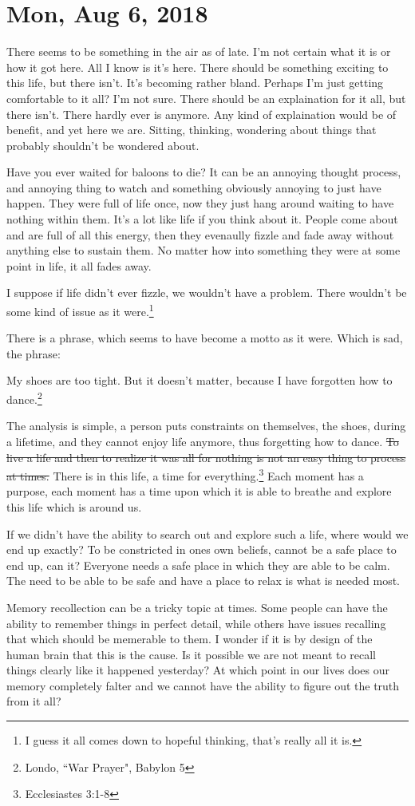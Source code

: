 \section{Mon, Aug 6, 2018}

There seems to be something in the air as of late. I'm not certain what it is or how
it got here. All I know is it's here. There should be something exciting to this
life, but there isn't. It's becoming rather bland. Perhaps I'm just getting
comfortable to it all? I'm not sure. There should be an explaination for it all, but
there isn't. There hardly ever is anymore. Any kind of explaination would be of
benefit, and yet here we are. Sitting, thinking, wondering about things that probably
shouldn't be wondered about.

Have you ever waited for baloons to die? It can be an annoying thought process, and
annoying thing to watch and something obviously annoying to just have happen. They
were full of life once, now they just hang around waiting to have nothing within
them. It's a lot like life if you think about it. People come about and are full of
all this energy, then they evenaully fizzle and fade away without anything else to
sustain them. No matter how into something they were at some point in life, it all
fades away.

I suppose if life didn't ever fizzle, we wouldn't have a problem. There wouldn't be
some kind of issue as it were.\footnote{I guess it all comes down to hopeful
thinking, that's really all it is.}

There is a phrase, which seems to have become a motto as it were. Which is sad, the
phrase:

\begin{displayquote}
My shoes are too tight. But it doesn't matter, because I have forgotten how to 
dance.\footnote{Londo, ``War Prayer", Babylon 5}
\end{displayquote}

The analysis is simple, a person puts constraints on themselves, the shoes, during a
lifetime, and they cannot enjoy life anymore, thus forgetting how to dance. \st{To 
live a life and then to realize it was all for nothing is not an easy thing to
process at times.} There is in this life, a time for everything.\footnote{
Ecclesiastes 3:1-8} Each moment has a purpose, each moment has a time upon which it 
is able to breathe and explore this life which is around us.

If we didn't have the ability to search out and explore such a life, where would we
end up exactly? To be constricted in ones own beliefs, cannot be a safe place to end
up, can it? Everyone needs a safe place in which they are able to be calm. The need
to be able to be safe and have a place to relax is what is needed most.

Memory recollection can be a tricky topic at times. Some people can have the ability
to remember things in perfect detail, while others have issues recalling that which
should be memerable to them. I wonder if it is by design of the human brain that this
is the cause. Is it possible we are not meant to recall things clearly like it
happened yesterday? At which point in our lives does our memory completely falter and
we cannot have the ability to figure out the truth from it all?